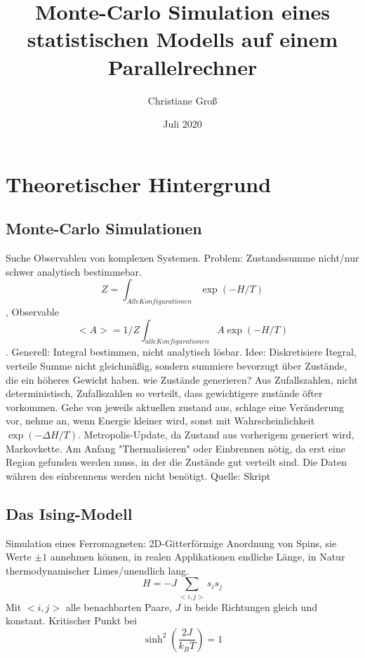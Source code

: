 \documentclass{scrreprt}
\title{Monte-Carlo Simulation eines statistischen Modells auf einem Parallelrechner}
\date{Juli 2020}
\author{Christiane Groß}
\begin{document}
	\maketitle
	
	
	\tableofcontents
	
	\clearpage
	
	\chapter{Theoretischer Hintergrund}
	\section{Monte-Carlo Simulationen}
	Suche Observablen von komplexen Systemen. Problem: Zustandssumme nicht/nur schwer analytisch bestimmebar. \[Z=\int_{Alle Konfigurationen}\exp(-H/T)\], Observable \[<A>=1/Z\int_{alle Konfigurationen} A\exp(-H/T)\]. Generell: Integral bestimmen, nicht analytisch lösbar.
	Idee: Diskretisiere Itegral, verteile Summe nicht gleichmäßig, sondern summiere bevorzugt über Zustände, die ein höheres Gewicht haben. 
	wie Zustände generieren? Aus Zufallszahlen, nicht deterministisch, Zufallszahlen so verteilt, dass gewichtigere zustände öfter vorkommen. Gehe von jeweils aktuellen zustand aus, schlage eine Veränderung vor, nehme an, wenn Energie kleiner wird, sonst mit Wahrscheinlichkeit $\exp(-\Delta H/T)$. Metropolis-Update, da Zustand aus vorherigem generiert wird, Markovkette.
	Am Anfang "Thermalisieren" oder Einbrennen nötig, da erst eine Region gefunden werden muss, in der die Zustände gut verteilt sind. Die Daten währen des einbrennens werden nicht benötigt.
	 Quelle: Skript
	
	\section{Das Ising-Modell}
	Simulation eines Ferromagneten: 2D-Gitterförmige Anordnung von Spins, sie Werte $\pm1$ annehmen können, in realen Applikationen endliche Länge, in Natur thermodynamischer Limes/unendlich lang.
	\begin{equation}
	H=-J\sum_{<i,j>}s_is_j
	\label{eq:hamiltonianising}
	\end{equation}
	Mit $<i,j>$ alle benachbarten Paare, $J$ in beide Richtungen gleich und konstant.
	Kritischer Punkt bei \[\sinh^2\left(\frac{2J}{k_BT}\right) =1\]
	\cite{OnsagerCrystal1}
	
\end{document}
